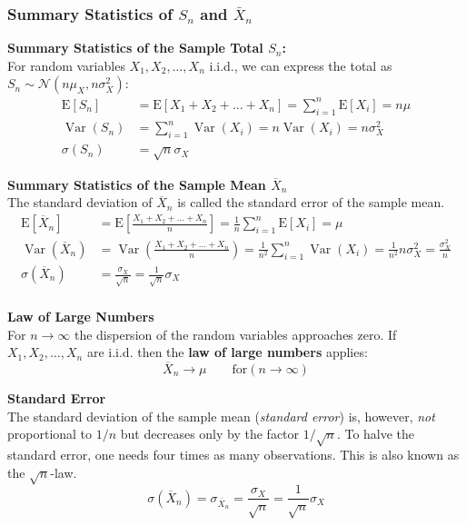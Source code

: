 \documentclass[11pt]{article}
\newcommand*\samplemean[1]{\overline{#1}}
\newcommand*\ev[1]{\mathrel{\text{E}\left[#1\right]}}
\newcommand*\N[1]{\mathcal{N}\left(#1\right)}
\newcommand*\Var[1]{\mathop{\text{Var}}\left(#1\right)}
\begin{document}
\subsubsection{Summary Statistics of $S_n$ and $\bar{X}_n$}

\begin{definition}
	\textbf{Summary Statistics of the Sample Total $S_n$:}\\
	For random variables $X_1,X_2,\dots,X_n$ i.i.d., we can express the total as $S_n \sim \N{n \mu_X, n \sigma^2_X}$:
	\begin{align*}
		\ev{S_n} &= \ev{X_1 + X_2 + \dots + X_n} = \sum_{i=1}^{n} \ev{X_i} = n\mu\\
		\Var{S_n} &= \sum_{i=1}^{n}\Var{X_i} = n\Var{X_i} = n\sigma_X^2\\
		\sigma(S_n) &= \sqrt{n}\sigma_X
	\end{align*}
\end{definition}

\begin{definition}
	\textbf{Summary Statistics of the Sample Mean $\samplemean{X}_n$}\\
	The standard deviation of $\samplemean{X}_n$ is called the standard error of the sample mean.
	\begin{align*}
		\ev{\samplemean{X}_n} &= \ev{\frac{X_1 + X_2 + \dots + X_n}{n}} = \frac{1}{n} \sum_{i=1}^{n} \ev{X_i} = \mu\\
		\Var{\samplemean{X}_n} &= \Var{\frac{X_1 + X_2 + \dots + X_n}{n}} = \frac{1}{n^2} \sum_{i=1}^{n}\Var{X_i} = \frac{1}{n^2}n\sigma_X^2 = \frac{\sigma_X^2}{n}\\
		\sigma (\samplemean{X}_n) &= \frac{\sigma_X}{\sqrt{n}} = \frac{1}{\sqrt{n}} \sigma_X\\
	\end{align*}
\end{definition}

\begin{definition}
	\textbf{Law of Large Numbers}\\
	For $n\rightarrow\infty$ the dispersion of the random variables approaches zero. If $X_1,X_2,\dots,X_n$ are i.i.d. then the \textbf{law of large numbers} applies:
	\begin{equation*}
		\samplemean{X}_n \longrightarrow \mu \qquad\text{for} (n\rightarrow\infty)
	\end{equation*}
\end{definition}

\begin{definition}
	\textbf{Standard Error}\\
	The standard deviation of the sample mean (\textit{standard error}) is, however, \textit{not} proportional
	to $1/n$ but decreases only by the factor $1/\sqrt{n}$. To halve the standard error, one needs four times as many observations. This is also known as the $\sqrt{n}$-law.
	\begin{equation*}
		\sigma (\samplemean{X}_n) = \sigma_{\samplemean{X}_n} = \frac{\sigma_X}{\sqrt{n}} = \frac{1}{\sqrt{n}} \sigma_X
	\end{equation*}
\end{definition}
\end{document}
